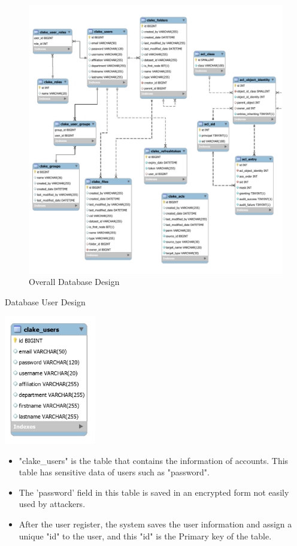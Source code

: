 \begin{figure}[H]
    \centering
    \includegraphics[width=1.0\textwidth]{images/OverallDatabaseDesign.pdf}
    \caption{Overall Database Design}
    \label{fig:DatabaseDesign}
\end{figure}

\begin{table}[H]
  \centering
  \caption{Database User Design}
  \label{tbl:dbUser}
  \includegraphics[width=0.3\textwidth]{images/DatabaseUserDesign.PNG}
\end{table}
\begin{itemize}
    \item "clake\_users" is the table that contains the information of accounts. This table has sensitive data of users such as "password". 
    \item The 'password' field in this table is saved in an encrypted form not easily used by attackers. 
    \item After the user register, the system saves the user information and assign a unique "id" to the user, and this "id" is the Primary key of the table. 
\end{itemize}

